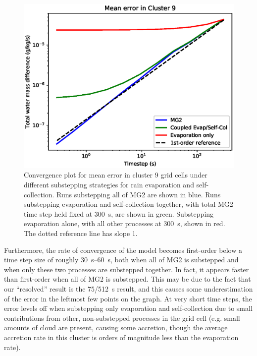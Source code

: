 \documentclass [11pt, proquest] {uwthesis}[2020/02/24]
\begin{document}
\begin{figure}[htbp]
  \includegraphics[width=6.5in]{./substep_convergence_mean_c9_richext.eps}
  \caption[Convergence plot for mean MG2 error in a cluster of rainy, cloudless grid cells using different substepping strategies]{Convergence plot for mean error in cluster 9 grid cells under different substepping strategies for rain evaporation and self-collection. Runs substepping all of MG2 are shown in blue. Runs substepping evaporation and self-collection together, with total MG2 time step held fixed at \SI{300}{\second}, are shown in green. Substepping evaporation alone, with all other processes at \SI{300}{\second}, shown in red. The dotted reference line has slope \num{1}.}
  \label{convergence-evap-scol}
\end{figure}

Furthermore, the rate of convergence of the model becomes first-order below a time step size of roughly \SIrange{30}{60}{\second}, both when all of MG2 is substepped and when only these two processes are substepped together. In fact, it appears faster than first-order when all of MG2 is substepped. This may be due to the fact that our ``resolved'' result is the \SI{75/512}{\second} result, and this causes some underestimation of the error in the leftmost few points on the graph. At very short time steps, the error levels off when substepping only evaporation and self-collection due to small contributions from other, non-substepped processes in the grid cell (e.g. small amounts of cloud are present, causing some accretion, though the average accretion rate in this cluster is orders of magnitude less than the evaporation rate).
\end{document}
